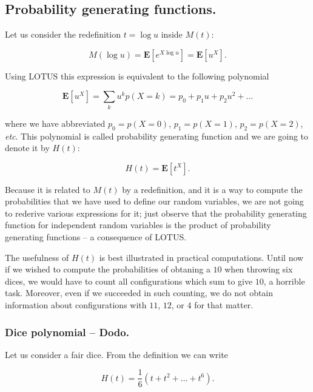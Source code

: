 \documentclass[12pt]{article}
\begin{document}
\subsection{Probability generating functions.}

Let us consider the redefinition $t = \log u$ inside $M(t)$:

\begin{equation}
M( \log u ) = \mathbf{E} \left[ e^{ X \log u } \right] 
= \mathbf{E} \left[ u^{X} \right].
\end{equation}

\noindent
Using LOTUS this expression is equivalent to the following polynomial

\begin{equation}
\mathbf{E} \left[ u^{X} \right] = 
\sum_{k} u^{k} p ( X = k) = 
p_{0} + p_{1} u + p_{2} u^{2} + \ldots
\end{equation}

\noindent
where we have abbreviated $p_{0} = p(X = 0)$, $p_{1} = p(X = 1)$, $p_{2} = p(X = 2)$, \textit{etc}.
This polynomial is called probability generating function and we are going 
to denote it by $H(t)$:

\begin{equation}
H(t) = \mathbf{E} [ t^{X} ].
\end{equation}

\noindent
Because it is related to $M(t)$ by a redefinition, and it is a way to compute the probabilities that we have
used to define our random variables, we are not going to rederive various expressions for it; just observe that the 
probability generating function for independent random variables is the product of probability generating functions -- 
a consequence of LOTUS.

The usefulness of $H(t)$ is best illustrated in practical computations.
Until now if we wished to compute the probabilities of obtaning a $10$ when throwing six dices, 
we would have to count all configurations which sum to give $10$,
a horrible task.
Moreover, even if we succeeded in such counting, we do not 
obtain information about configurations with $11$, $12$, or $4$ for that matter.

\subsubsection{Dice polynomial -- Dodo.}
Let us consider a fair dice. From the definition we can write

\begin{equation}
H(t) = \frac{1}{6} \left( t + t^{2} + \ldots + t^{6} \right).
\end{equation}
\end{document}
